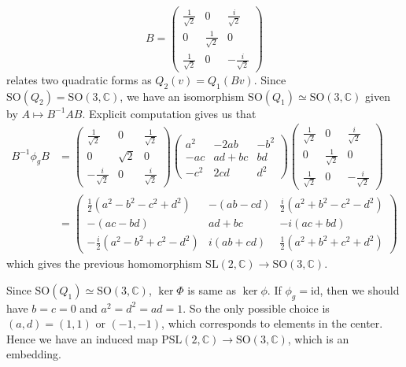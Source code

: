 \documentclass{article}
\newcommand{\PSL}{\mathrm{PSL}}
\newcommand{\SO}{\mathrm{SO}}
\newcommand{\SL}{\mathrm{SL}}
\begin{document}
$$
B = \begin{pmatrix} \frac{1}{\sqrt{2}} & 0 & \frac{i}{\sqrt{2}} \\ 0 & \frac{1}{\sqrt{2}} & 0 \\ \frac{1}{\sqrt{2}} & 0 & -\frac{i}{\sqrt{2}} \end{pmatrix}
$$
relates two quadratic forms as $Q_{2}(v) = Q_{1}(Bv)$. 
Since $\SO(Q_{2}) = \SO(3, \mathbb{C})$, we have an isomorphism $\SO(Q_{1})\simeq \SO(3, \mathbb{C})$ given by $A\mapsto B^{-1}AB$. 
Explicit computation gives us that 
\begin{align*}
B^{-1}\phi_{g}B &= \begin{pmatrix} \frac{1}{\sqrt{2}} & 0 & \frac{1}{\sqrt{2}} \\ 0 & \sqrt{2} & 0 \\ -\frac{i}{\sqrt{2}} & 0 & \frac{i}{\sqrt{2}} \end{pmatrix}\begin{pmatrix} a^{2} & -2ab & -b^{2} \\ -ac & ad+bc & bd \\ -c^{2} & 2cd & d^{2} \end{pmatrix}\begin{pmatrix} \frac{1}{\sqrt{2}} & 0 & \frac{i}{\sqrt{2}} \\ 0 & \frac{1}{\sqrt{2}} & 0 \\ \frac{1}{\sqrt{2}} & 0 & -\frac{i}{\sqrt{2}} \end{pmatrix} \\
&=\begin{pmatrix} \frac{1}{2}(a^{2}-b^{2}-c^{2} + d^{2}) & -(ab-cd) & \frac{i}{2}(a^{2}+b^{2}-c^{2}-d^{2}) \\ -(ac-bd) & ad+bc & -i(ac+bd)  \\ 
-\frac{i}{2}(a^{2}-b^{2}+c^{2}-d^{2}) & i(ab+cd) & \frac{1}{2}(a^{2}+b^{2}+c^{2}+d^{2}) \end{pmatrix}
\end{align*}
which gives the previous homomorphism $\SL(2, \mathbb{C}) \to \SO(3, \mathbb{C})$. 

Since $\SO(Q_{1})\simeq \SO(3, \mathbb{C})$, $\ker \Phi$ is same as $\ker \phi$. 
If $\phi_{g} = \mathrm{id}$, then we should have $b = c = 0$ and $a^{2} = d^{2} = ad = 1$. 
So the only possible choice is $(a, d) = (1, 1)$ or $(-1, -1)$, which corresponds to elements in the center.
Hence we have an induced map $\PSL(2, \mathbb{C})\to \SO(3, \mathbb{C})$, which is an embedding. 
\end{document}
